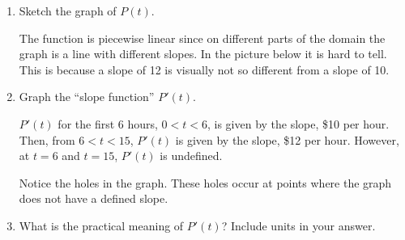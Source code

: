 \documentclass{article}
\begin{document}
\begin{enumerate}
\begin{enumerate}
  \item
    \begin{problem}[\vfill]
      Sketch the graph of $P(t)$.
    \end{problem}

    \begin{solution}  The function is piecewise linear
      since on different parts of the domain the graph is a line with
      different slopes. In the picture below it is hard to tell. This is
      because a slope of 12 is visually not so different from a slope of
      10. \\

    \end{solution} 

  \item
    \begin{problem}[\vfill]
      Graph the ``slope function'' $P'(t)$. 
    \end{problem}

    \begin{solution}
      $P'(t)$ for the first 6 hours, 
      $0 < t < 6$, is given by the slope, \$10 per hour. Then, from
      $6<t<15$, $P'(t)$ is given by the slope, \$12 per hour. However, 
      at $t = 6$ and $t = 15$, $P'(t)$ is undefined.  


      Notice the holes in the graph. These holes occur at
      points where the graph does not have a defined slope.  
    \end{solution}    

  \item
    \begin{problem}[0.5in]
      What is the practical meaning of $P'(t)$? Include units in your
      answer.
    \end{problem}


\end{enumerate}
\end{enumerate}
\end{document}
